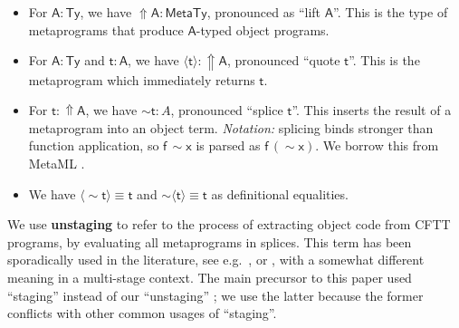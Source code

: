 \documentclass[acmsmall,screen]{acmart}
\newcommand{\msf}[1]{{\mathsf{#1}}}
\newcommand{\bs}[1]{\boldsymbol{#1}}
\newcommand{\vA}{\mathsf{A}}
\newcommand{\vx}{\mathsf{x}}
\newcommand{\vf}{\mathsf{f}}
\newcommand{\vt}{\mathsf{t}}
\newcommand{\Lift}{{\Uparrow}}
\newcommand{\spl}{{\bs{\sim}}}
\newcommand{\ql}{{\bs{\langle}}}
\newcommand{\qr}{{\bs{\rangle}}}
\newcommand{\MTy}{\msf{MetaTy}}
\newcommand{\Ty}{\msf{Ty}}
\theoremstyle{remark}
\begin{document}
\begin{itemize}
\item For $\vA : \Ty$, we have $\Lift \vA : \MTy$, pronounced as ``lift $\vA$''. This is
      the type of metaprograms that produce $\vA$-typed object programs.
\item For $\vA : \Ty$ and $\vt : \vA$, we have $\ql \vt \qr : \Lift \vA$, pronounced ``quote $\vt$''. This
      is the metaprogram which immediately returns $\vt$.
\item For $\vt : \Lift \vA$, we have $\spl \vt : A$, pronounced ``splice
  $\vt$''. This inserts the result of a metaprogram into an object
  term. \emph{Notation:} splicing binds stronger than function application, so
  $\vf\,\spl \vx$ is parsed as $\vf\,(\spl \vx)$. We borrow this from
  MetaML \cite{metaml}.
\item We have $\ql \spl \vt \qr \equiv \vt$ and $\spl \ql \vt \qr \equiv \vt$ as definitional equalities.
\end{itemize}

We use \textbf{unstaging} to refer to the process of extracting object code from
CFTT programs, by evaluating all metaprograms in splices. This term has been
sporadically used in the literature, see
e.g.\ \cite{DBLP:journals/cacm/RompfO12}, or \cite{DBLP:conf/popl/ChoiAYT11},
with a somewhat different meaning in a multi-stage context. The main precursor
to this paper used ``staging'' instead of our ``unstaging'' \cite{staged2ltt};
we use the latter because the former conflicts with other common usages of
``staging''.
\end{document}
